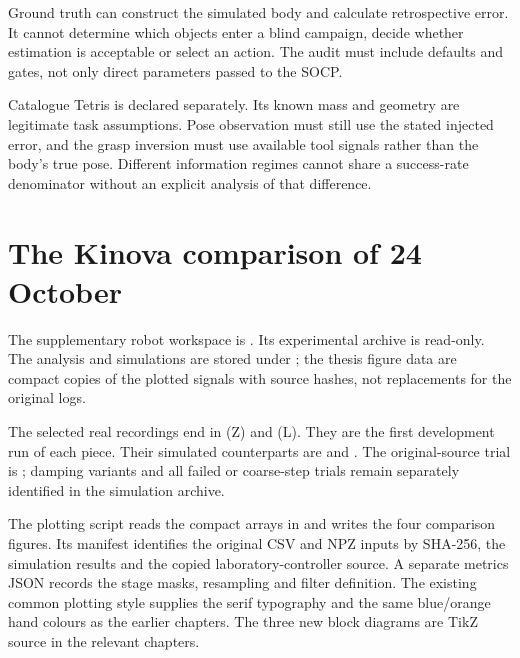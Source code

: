 Ground truth can construct the simulated body and calculate retrospective error. It cannot determine which objects enter a blind campaign, decide whether estimation is acceptable or select an action. The audit must include defaults and gates, not only direct parameters passed to the SOCP.

Catalogue Tetris is declared separately. Its known mass and geometry are legitimate task assumptions. Pose observation must still use the stated injected error, and the grasp inversion must use available tool signals rather than the body's true pose. Different information regimes cannot share a success-rate denominator without an explicit analysis of that difference.

\section{The Kinova comparison of 24 October}

The supplementary robot workspace is . Its experimental archive  is read-only. The analysis and simulations are stored under ; the thesis figure data are compact copies of the plotted signals with source hashes, not replacements for the original logs.

The selected real recordings end in  (Z) and  (L). They are the first development run of each piece. Their simulated counterparts are  and . The original-source trial is ; damping variants and all failed or coarse-step trials remain separately identified in the simulation archive.

The plotting script  reads the compact arrays in  and writes the four comparison figures. Its manifest identifies the original CSV and NPZ inputs by SHA-256, the simulation results and the copied laboratory-controller source. A separate metrics JSON records the stage masks, resampling and filter definition. The existing common plotting style supplies the serif typography and the same blue/orange hand colours as the earlier chapters. The three new block diagrams are TikZ source in the relevant chapters.

